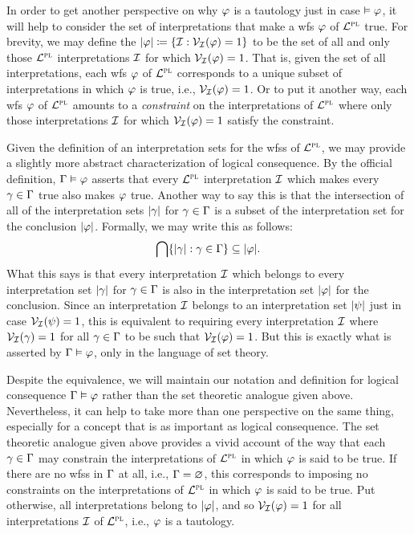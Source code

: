 In order to get another perspective on why $\varphi$ is a tautology just in case $\vDash \varphi$, it will help to consider the set of interpretations that make a wfs $\varphi$ of $\mathcal{L}^{\textsc{pl}}$ true. 
For brevity, we may define the  $\lvert\varphi\rvert \coloneq \lbrace\mathcal{I} : \mathcal{V}_{\mathcal{I}}(\varphi) = 1\rbrace$ to be the set of all and only those $\mathcal{L}^{\textsc{pl}}$ interpretations $\mathcal{I}$ for which $\mathcal{V}_{\mathcal{I}}(\varphi) = 1$.
That is, given the set of all interpretations, each wfs $\varphi$ of $\mathcal{L}^{\textsc{pl}}$ corresponds to a unique subset of interpretations in which $\varphi$ is true, i.e., $\mathcal{V}_{\mathcal{I}}(\varphi) = 1$.
Or to put it another way, each wfs $\varphi$ of $\mathcal{L}^{\textsc{pl}}$ amounts to a \textit{constraint} on the interpretations of $\mathcal{L}^{\textsc{pl}}$ where only those interpretations $\mathcal{I}$ for which $\mathcal{V}_{\mathcal{I}}(\varphi) = 1$ satisfy the constraint. 

Given the definition of an interpretation sets for the wfss of $\mathcal{L}^{\textsc{pl}}$, we may provide a slightly more abstract characterization of logical consequence.
By the official definition, $\Gamma \vDash \varphi$ asserts that every $\mathcal{L}^{\textsc{pl}}$ interpretation $\mathcal{I}$ which makes every $\gamma \in \Gamma$ true also makes $\varphi$ true. 
Another way to say this is that the intersection of all of the interpretation sets $\lvert\gamma\rvert$ for $\gamma \in \Gamma$ is a subset of the interpretation set for the conclusion $\lvert\varphi\rvert$.
Formally, we may write this as follows:
  $$ \bigcap \lbrace \lvert\gamma\rvert : \gamma \in \Gamma\rbrace \subseteq \lvert\varphi\rvert. $$
What this says is that every interpretation $\mathcal{I}$ which belongs to every interpretation set $\lvert\gamma\rvert$ for $\gamma \in \Gamma$ is also in the interpretation set $\lvert\varphi\rvert$ for the conclusion.
Since an interpretation $\mathcal{I}$ belongs to an interpretation set $\lvert\psi\rvert$ just in case $\mathcal{V}_{\mathcal{I}}(\psi) = 1$, this is equivalent to requiring every interpretation $\mathcal{I}$ where $\mathcal{V}_{\mathcal{I}}(\gamma) = 1$ for all $\gamma \in \Gamma$ to be such that $\mathcal{V}_{\mathcal{I}}(\varphi) = 1$.
But this is exactly what is asserted by $\Gamma \vDash \varphi$, only in the language of set theory.

Despite the equivalence, we will maintain our notation and definition for logical consequence $\Gamma \vDash \varphi$ rather than the set theoretic analogue given above. 
Nevertheless, it can help to take more than one perspective on the same thing, especially for a concept that is as important as logical consequence.
The set theoretic analogue given above provides a vivid account of the way that each $\gamma \in \Gamma$ may constrain the interpretations of $\mathcal{L}^{\textsc{pl}}$ in which $\varphi$ is said to be true. 
If there are no wfss in $\Gamma$ at all, i.e., $\Gamma = \varnothing$, this corresponds to imposing no constraints on the interpretations of $\mathcal{L}^{\textsc{pl}}$ in which $\varphi$ is said to be true. 
Put otherwise, all interpretations belong to $\lvert\varphi\rvert$, and so $\mathcal{V}_{\mathcal{I}}(\varphi) = 1$ for all interpretations $\mathcal{I}$ of $\mathcal{L}^{\textsc{pl}}$, i.e., $\varphi$ is a tautology. 

